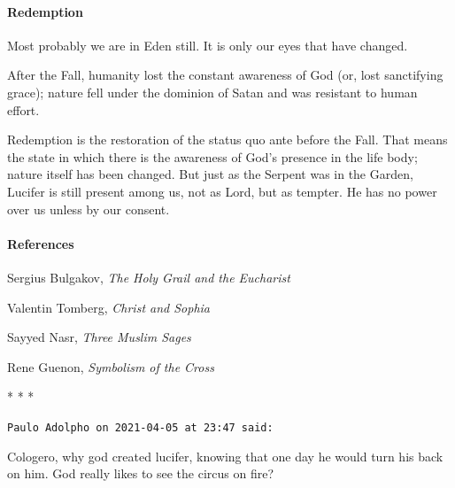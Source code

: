 \paragraph{Redemption}
\begin{quotex}
Most probably we are in Eden still. It is only our eyes that have changed. 

\end{quotex}
After the Fall, humanity lost the constant awareness of God (or, lost sanctifying grace); nature fell under the dominion of Satan and was resistant to human effort.

Redemption is the restoration of the status quo ante before the Fall. That means the state in which there is the awareness of God's presence in the life body; nature itself has been changed. But just as the Serpent was in the Garden, Lucifer is still present among us, not as Lord, but as tempter. He has no power over us unless by our consent.

\paragraph{References}
Sergius Bulgakov, \emph{The Holy Grail and the Eucharist}

Valentin Tomberg, \emph{Christ and Sophia}

Sayyed Nasr, \emph{Three Muslim Sages}

Rene Guenon, \emph{Symbolism of the Cross}




\begin{center}* * *\end{center}

\begin{footnotesize}\begin{sffamily}



\texttt{Paulo Adolpho on 2021-04-05 at 23:47 said: }

Cologero, why god created lucifer, knowing that one day he would turn his back on him. God really likes to see the circus on fire?


\end{sffamily}\end{footnotesize}
